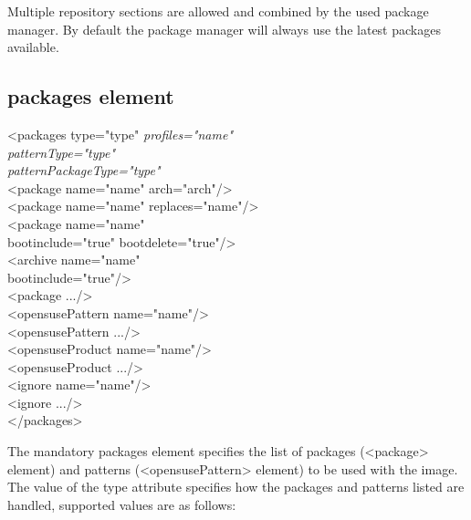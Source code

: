 Multiple repository sections are allowed and combined by the
used package manager. By default the package manager will always use
the latest packages available.

\subsection{packages element}
\begin{Command}{12cm}
<packages type="type" \textit{profiles="name"}\\
\hspace*{2.5cm}\textit{patternType="type"}\\
\hspace*{2.5cm}\textit{patternPackageType="type"}\\
\hspace*{1cm}<package name="name" arch="arch"/>\\
\hspace*{1cm}<package name="name" replaces="name"/>\\
\hspace*{1cm}<package name="name"\\
\hspace*{2.5cm}bootinclude="true" bootdelete="true"/>\\
\hspace*{1cm}<archive name="name"\\
\hspace*{2.5cm}bootinclude="true"/>\\
\hspace*{1cm}<package .../>\\
\hspace*{1cm}<opensusePattern name="name"/>\\
\hspace*{1cm}<opensusePattern .../>\\
\hspace*{1cm}<opensuseProduct name="name"/>\\
\hspace*{1cm}<opensuseProduct .../>\\
\hspace*{1cm}<ignore name="name"/>\\
\hspace*{1cm}<ignore .../>\\
</packages>
\end{Command}

The mandatory packages element specifies the list of packages (<package> 
element) and patterns (<opensusePattern> element) to be used with the image.
The value of the type attribute specifies how the packages and patterns 
listed are handled, supported values are as follows:

